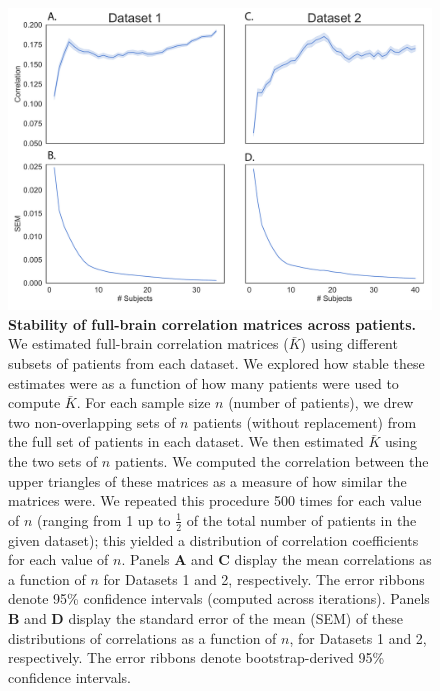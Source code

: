 \documentclass[11pt]{article}
\begin{document}
\begin{figure}[p]
\centering \includegraphics[width=\textwidth]{figs/supplemental_8}
\caption{\textbf{Stability of full-brain correlation matrices across patients.}
We estimated full-brain correlation matrices ($\bar{K}$) using different subsets
of patients from each dataset. We explored how stable these estimates were as a
function of how many patients were used to compute $\bar{K}$. For each sample
size $n$ (number of patients), we drew two non-overlapping sets of $n$ patients
(without replacement) from the full set of patients in each dataset. We then estimated $\bar{K}$ using the two sets of $n$ patients.  We computed the correlation between the upper triangles of these matrices as a measure of how similar the matrices were.  We repeated this procedure 500 times for each value of $n$ (ranging from 1 up to $\frac{1}{2}$ of the total number of patients in the given dataset); this yielded a distribution of correlation coefficients for each value of $n$.  Panels \textbf{A} and \textbf{C} display the mean correlations as a function of $n$ for Datasets 1 and 2, respectively.  The error ribbons denote 95\% confidence intervals (computed across iterations).  Panels \textbf{B} and \textbf{D} display
the standard error of the mean (SEM) of these distributions of correlations as a function of $n$, for Datasets 1 and 2, respectively.  The error ribbons
denote bootstrap-derived 95\% confidence intervals.}
\label{fig:supplemental_8}
\end{figure}

\clearpage
\newpage
\renewcommand{\refname}{Supplemental references}
\renewcommand{\bibnumfmt}[1]{[S#1]}
\renewcommand{\citenumfont}[1]{S#1}



% 
\end{document}
